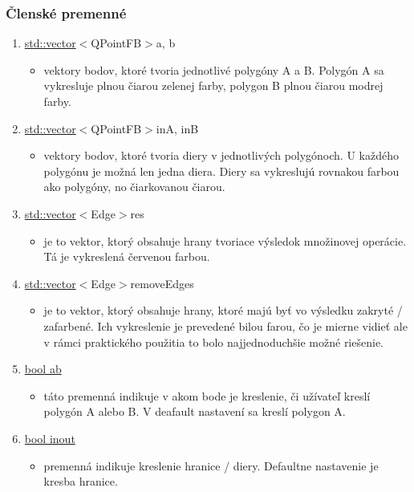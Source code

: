\documentclass[12pt]{article}
\begin{document}
\subsubsection{Členské premenné}
\begin{enumerate}

\item[] \underline {std::vector}$<${QPointFB}$>${a, b}
\begin{itemize}
\item vektory bodov, ktoré tvoria  jednotlivé polygóny A a B. Polygón A sa vykresluje plnou čiarou zelenej farby, polygon B plnou čiarou modrej farby.
\end{itemize}

\item[] \underline {std::vector}$<${QPointFB}$>${inA, inB}
\begin{itemize}
\item vektory bodov, ktoré tvoria diery v jednotlivých polygónoch. U každého polygónu je možná len jedna diera. Diery sa vykreslujú rovnakou farbou ako polygóny, no čiarkovanou čiarou.
\end{itemize}

\item[] \underline {std::vector}$<${Edge}$>${res}
\begin{itemize}
\item je to vektor, ktorý obsahuje hrany tvoriace výsledok množinovej operácie. Tá je vykreslená červenou farbou.
\end{itemize}

\item[] \underline {std::vector}$<${Edge}$>${removeEdges}
\begin{itemize}
\item je to vektor, ktorý obsahuje hrany, ktoré majú byť vo výsledku zakryté / zafarbené. Ich vykreslenie je prevedené bilou farou, čo je mierne vidieť ale v rámci praktického použitia to bolo najjednoduchšie možné riešenie. 
\end{itemize}

\item[] \underline {bool ab}
\begin{itemize}
\item táto premenná indikuje v akom bode je kreslenie, či užívateľ kreslí polygón A alebo B. V deafault nastavení sa kreslí polygon A.
\end{itemize}

\item[] \underline {bool inout}
\begin{itemize}
\item premenná indikuje kreslenie hranice / diery. Defaultne nastavenie je kresba hranice.
\end{itemize}
\end{enumerate}
\end{document}
